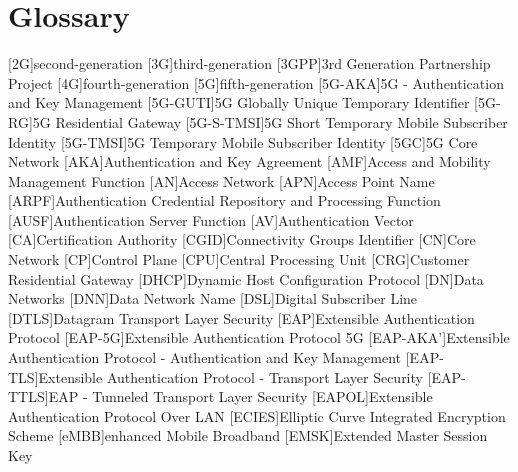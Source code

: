 \chapter{Glossary}

\footnotesize
\SingleSpacing

\begin{multicols}{2}
    \begin{acronym}[AAAAAA]
        [2G]{second-generation}
        [3G]{third-generation}
        [3GPP]{3rd Generation Partnership Project}
        [4G]{fourth-generation}
        [5G]{fifth-generation}
        [5G-AKA]{5G - Authentication and Key Management}
        [5G-GUTI]{5G Globally Unique Temporary Identifier}
        [5G-RG]{5G Residential Gateway}
        [5G-S-TMSI]{5G Short Temporary Mobile Subscriber Identity}
        [5G-TMSI]{5G Temporary Mobile Subscriber Identity}
        [5GC]{5G Core Network}
        [AKA]{Authentication and Key Agreement}
        [AMF]{Access and Mobility Management Function}
        [AN]{Access Network}
        [APN]{Access Point Name}
        [ARPF]{Authentication Credential Repository and Processing Function}
        [AUSF]{Authentication Server Function}
        [AV]{Authentication Vector}
        [CA]{Certification Authority}
        [CGID]{Connectivity Groups Identifier}
        [CN]{Core Network}
        [CP]{Control Plane}
        [CPU]{Central Processing Unit}
        [CRG]{Customer Residential Gateway}
        [DHCP]{Dynamic Host Configuration Protocol}
        [DN]{Data Networks}
        [DNN]{Data Network Name}
        [DSL]{Digital Subscriber Line}
        [DTLS]{Datagram Transport Layer Security}
        [EAP]{Extensible Authentication Protocol}
        [EAP-5G]{Extensible Authentication Protocol 5G}
        [EAP-AKA']{Extensible Authentication Protocol - Authentication and Key Management}
        [EAP-TLS]{Extensible Authentication Protocol - Transport Layer Security}
        [EAP-TTLS]{EAP - Tunneled Transport Layer Security}
        [EAPOL]{Extensible Authentication Protocol Over LAN}
        [ECIES]{Elliptic Curve Integrated Encryption Scheme}
        [eMBB]{enhanced Mobile Broadband}
        [EMSK]{Extended Master Session Key}

\end{acronym}
\end{multicols}
